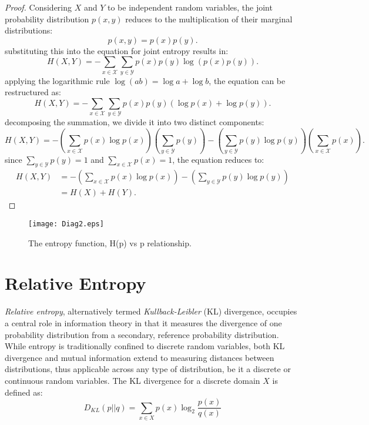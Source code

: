 \documentclass[journal,12pt,onecolumn,draftclsnofoot,]{IEEEtran}
\begin{document}
	\begin{proof}
		Considering \(X\) and \(Y\) to be independent random variables, the joint probability distribution \(p(x, y)\) reduces to the multiplication of their marginal distributions:
		\begin{equation}
			p(x, y) = p(x)p(y).
		\end{equation}
		substituting this into the equation for joint entropy results in:
		\begin{equation}
			H(X, Y) = -\sum_{x \in \mathcal{X}} \sum_{y \in \mathcal{Y}} p(x)p(y) \log (p(x)p(y)).
		\end{equation}
		applying the logarithmic rule \(\log(ab) = \log a + \log b\), the equation can be restructured as:
		\begin{equation}
			H(X, Y) = -\sum_{x \in \mathcal{X}} \sum_{y \in \mathcal{Y}} p(x)p(y) (\log p(x) + \log p(y)).
		\end{equation}
		decomposing the summation, we divide it into two distinct components:
		\begin{equation}
			H(X, Y) = -\left(\sum_{x \in \mathcal{X}} p(x) \log p(x)\right) \left(\sum_{y \in \mathcal{Y}} p(y)\right) - \left(\sum_{y \in \mathcal{Y}} p(y) \log p(y)\right) \left(\sum_{x \in \mathcal{X}} p(x)\right).
		\end{equation}
		since \(\sum_{y \in \mathcal{Y}} p(y) = 1\) and \(\sum_{x \in \mathcal{X}} p(x) = 1\), the equation reduces to:
		\begin{equation}
			\begin{split}
				H(X, Y) & =  -\left(\sum_{x \in \mathcal{X}} p(x) \log p(x)\right) - \left(\sum_{y \in \mathcal{Y}} p(y) \log p(y)\right) \\
				& = H(X) + H(Y). 
			\end{split}
		\end{equation}
	\end{proof}
	
		\begin{figure}
		\centering
		\texttt{[image: Diag2.eps]} 
		\caption{The entropy function, H(p) vs p relationship.}
	\end{figure}
	
	
	\section{Relative Entropy}
	\emph{Relative entropy}, alternatively termed \emph{Kullback-Leibler} (KL) divergence, occupies a central role in information theory in that it measures the divergence of one probability distribution from a secondary, reference probability distribution. While entropy is traditionally confined to discrete random variables, both KL divergence and mutual information extend to measuring distances between distributions, thus applicable across any type of distribution, be it a discrete or continuous random variables. The KL divergence for a discrete domain \(X\) is defined as:
	\[ D_{KL}(p||q) = \sum_{x \in X} p(x) \log_2 \frac{p(x)}{q(x)} \]
	
\end{document}
